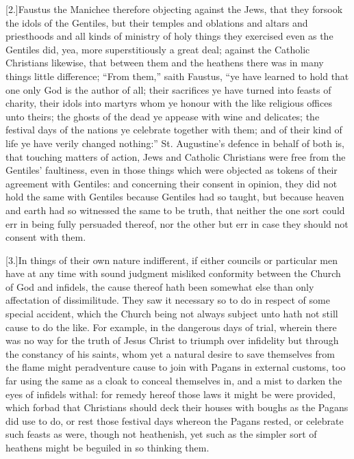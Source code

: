 [2.]Faustus the Manichee therefore objecting against the Jews, that they forsook the idols of the Gentiles, but their temples and oblations and altars and priesthoods and all kinds of ministry of holy things they exercised even as the Gentiles did, yea, more superstitiously a great deal; against the Catholic Christians likewise, that between them and the heathens there was in many things little difference; “From them,” saith Faustus, “ye have learned to hold that one only God is the author of all; their sacrifices ye have turned into feasts of charity, their idols into martyrs whom ye honour with the like religious offices unto theirs; the ghosts of the dead ye appease with wine and delicates; the festival days of the nations ye celebrate together with them; and of their kind  of life ye have verily changed nothing:” St. Augustine’s defence in behalf of both is, that touching matters of action, Jews and Catholic Christians were free from the Gentiles’ faultiness, even in those things which were objected as tokens of their agreement with Gentiles: and concerning their consent in opinion, they did not hold the same with Gentiles because Gentiles had so taught, but because heaven and earth had so witnessed the same to be truth, that neither the one sort could err in being fully persuaded thereof, nor the other but err in case they should not consent with them.

[3.]In things of their own nature indifferent, if either councils or particular men have at any time with sound judgment misliked conformity between the Church of God and infidels, the cause thereof hath been somewhat else than only affectation of dissimilitude. They saw it necessary so to do in respect of some special accident, which the Church being not always subject unto hath not still cause to do the like. For example, in the dangerous days of trial, wherein there was no way for the truth of Jesus Christ to triumph over infidelity but through the constancy of his saints, whom yet a natural desire to save themselves from the flame might peradventure cause to join with Pagans in external customs, too far using the same as a cloak to conceal themselves in, and a mist to darken the eyes of infidels withal: for remedy hereof those laws it might be were provided, which forbad that Christians should deck their houses with boughs as the Pagans did use to do, or rest those festival days whereon  the Pagans rested, or celebrate such feasts as were, though not heathenish, yet such as the simpler sort of heathens might be beguiled in so thinking them.

